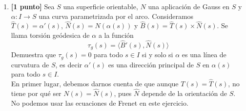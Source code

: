\documentclass[12pt]{article}
\begin{document}
\begin{ejercicio}
\begin{enumerate}[label=\alph*)]
\begin{itemize}
                        Si $\sen(t) = 1$ entonces:
                        \begin{equation*}
                            0 = 4\sen^2(t) -\sen(t)-2 = 4-1-2 = 1
                        \end{equation*}
                        Imposible, y si $\sen(t) = -1$ entonces:
                        \begin{equation*}
                            0 = 4\sen^2(t) -\sen(t)-2 = 4+1-2 = 3
                        \end{equation*}
                        Imposible
                \end{itemize}
                Así $\alpha'(t)\neq 0 \quad \forall t\in \mathbb{R}$, por lo que $\alpha$ es regular.

                Como hemos visto que $\alpha$ es regular podemos aplicar la fórmula:
                \begin{equation*}
                    k_\alpha(t) = \frac{\det(\alpha'(t),\alpha''(t))}{|\alpha'(t)|^3}
                \end{equation*}
                Teníamos ya que $\alpha'(t) = (4\sen^2(t)-\sen(t)-2, \cos(t) -2\cos(t)\sen(t))$, de donde:
                \begin{equation*}
                    \alpha''(t) = (8\sen(t)\cos(t)-\cos(t),-\sen(t)+2\sen^2(t)-2\cos^2(t)) 
                \end{equation*}
                Basta sustituir en la fórmula de la curvatura.
            \item \textbf{[1 punto]} Sea $S$ una superficie orientable, $N$ una aplicación de Gauss en $S$ y $\alpha:I\to S$ una curva parametrizada por el arco. Consideramos $\hat{T}(s) = \alpha'(s)$, $\hat{N}(s) = N(\alpha(s))$ y $\hat{B}(s) = \hat{T}(s)\times \hat{N}(s)$. Se llama torsión geódesica de $\alpha$ a la función
                \begin{equation*}
                    \tau_g(s) = \langle \hat{B}'(s), \hat{N}(s) \rangle 
                \end{equation*}
                Demuestra que $\tau_g(s) = 0$ para todo $s\in I$ si y solo si $\alpha$ es una línea de curvatura de $S$, es decir $\alpha'(s)$ es una dirección principal de $S$ en $\alpha(s)$ para todo $s\in I$.\\

                En primer lugar, debemos darnos cuenta de que aunque $T(s) = \hat{T}(s)$, no tiene por qué ser $N(s) = \hat{N}(s)$, pues $\hat{N}$ depende de la orientación de $S$. No podemos usar las ecuaciones de Frenet en este ejercicio.


\end{enumerate}
\end{ejercicio}
\end{document}
